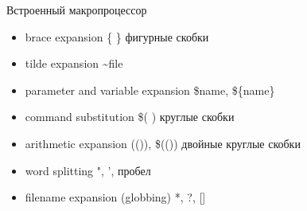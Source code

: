 \begin{frame}{Встроенный макропроцессор}

\begin{itemize}
    \item brace expansion  \alert{\{ \}} фигурные скобки
    \item tilde expansion \alert{\textasciitilde{}file}
    \item parameter and variable expansion \alert{\$name}, \alert{\$\{name\}} 
    \item command substitution \alert{\$( )} круглые скобки
    \item arithmetic expansion \alert{(())}, \alert{\$(())} двойные круглые скобки
    \item word splitting \alert{"}, \alert{'}, \alert{\textvisiblespace} пробел
    \item filename expansion (globbing) \alert{*}, \alert{?}, \alert{[]} 
\end{itemize}
    
\end{frame}
